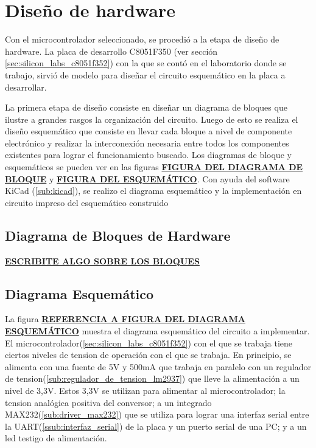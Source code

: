 \documentclass{article}
\theoremstyle{definition}
\theoremstyle{remark}
\begin{document}




\section{Diseño de hardware} %
\label{sec:diseno_de_hardware}


Con el microcontrolador seleccionado, se procedió a la etapa de diseño de hardware. La placa de desarrollo C8051F350 (ver sección \ref{sec:silicon_labs_c8051f352}) con la que se contó en el laboratorio donde se trabajo, sirvió de modelo para diseñar el circuito esquemático en la placa a desarrollar.

La primera etapa de diseño consiste en diseñar un diagrama de bloques que ilustre a grandes rasgos la organización del circuito. Luego de esto se realiza el diseño esquemático que consiste en llevar cada bloque a nivel de componente electrónico y realizar la interconexión necesaria entre todos los componentes existentes para lograr el funcionamiento buscado. Los diagramas de bloque y esquemáticos se pueden ver en las figuras \underline{\textbf{FIGURA DEL DIAGRAMA DE BLOQUE}} y \underline{\textbf{FIGURA DEL ESQUEMÁTICO}}. Con ayuda del software KiCad (\ref{sub:kicad}), se realizo el diagrama esquemático y la implementación en circuito impreso del esquemático construido

\subsection{Diagrama de Bloques de Hardware} %
\label{sub:diagrama_de_bloques_de_hardware}

\textbf{\underline{ESCRIBITE ALGO SOBRE LOS BLOQUES}}




\subsection{Diagrama Esquemático} %
\label{sub:diagrama_esquematico}

La figura \textbf{\underline{REFERENCIA A FIGURA DEL DIAGRAMA ESQUEMÁTICO}} muestra el diagrama esquemático del circuito a implementar. El microcontrolador(\ref{sec:silicon_labs_c8051f352}) con el que se trabaja tiene ciertos niveles de tension de operación con el que se trabaja. En principio, se alimenta con una fuente de 5V y 500mA que trabaja en paralelo con un regulador de tension(\ref{sub:regulador_de_tension_lm2937}) que lleve la alimentación a un nivel de 3,3V. Estos 3,3V se utilizan para alimentar al microcontrolador; la tension analógica positiva del conversor; a un integrado MAX232(\ref{sub:driver_max232}) que se utiliza para lograr una interfaz serial entre la UART(\ref{ssub:interfaz_serial}) de la placa y un puerto serial de una PC; y a un led testigo de alimentación.
\end{document}
